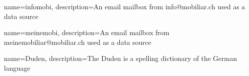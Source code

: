 {
    name=infomobi,
    description={An email mailbox from info@mobiliar.ch used as a data source}
}

{
    name=meinemobi,
    description={An email mailbox from meinemobiliar@mobiliar.ch used as a data source}
}

{
    name=Duden,
    description={The Duden is a spelling dictionary of the German language}
}



